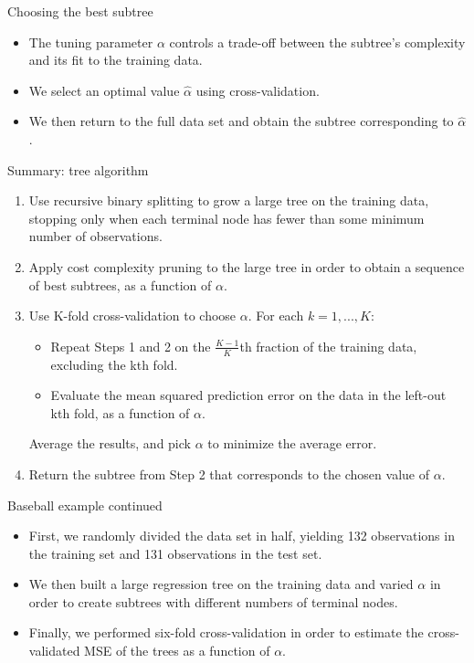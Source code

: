 \documentclass[aspectratio=169, 11pt]{beamer}
\begin{document}
\begin{frame}{Choosing the best subtree}
\begin{itemize}
    \item The tuning parameter $\alpha$ controls a trade-off between the subtree's complexity and its fit to the training data.
    \item We select an optimal value $\hat{\alpha}$ using cross-validation.
    \item We then return to the full data set and obtain the subtree corresponding to $\hat{\alpha}$.
\end{itemize}
\end{frame}

\begin{frame}{Summary: tree algorithm}
\begin{enumerate}
    \item Use recursive binary splitting to grow a large tree on the training data, stopping only when each terminal node has fewer than some minimum number of observations.
    \item Apply cost complexity pruning to the large tree in order to obtain a sequence of best subtrees, as a function of $\alpha$.
    \item Use K-fold cross-validation to choose $\alpha$. For each $k=1,...,K$:
    \begin{itemize}
        \item[3.1] Repeat Steps 1 and 2 on the $\frac{K-1}{K}$th fraction of the training data, excluding the kth fold.
        \item[3.2] Evaluate the mean squared prediction error on the data in the left-out kth fold, as a function of $\alpha$.
    \end{itemize}
    Average the results, and pick $\alpha$ to minimize the average error.
    \item Return the subtree from Step 2 that corresponds to the chosen value of $\alpha$.
\end{enumerate}
\end{frame}

\begin{frame}{Baseball example continued}
\begin{itemize}
    \item First, we randomly divided the data set in half, yielding 132 observations in the training set and 131 observations in the test set.
    \item We then built a large regression tree on the training data and varied $\alpha$ in order to create subtrees with different numbers of terminal nodes.
    \item Finally, we performed six-fold cross-validation in order to estimate the cross-validated MSE of the trees as a function of $\alpha$.
\end{itemize}
\end{frame}
\end{document}
